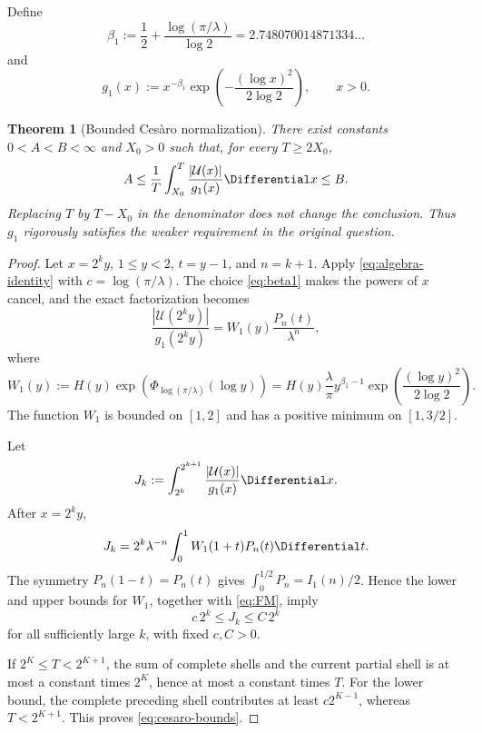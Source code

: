 \documentclass[11pt,oneside]{article}
\newtheorem{theorem}{Theorem}[section]
\theoremstyle{definition}
\theoremstyle{remark}
\newcommand{\Uhat}{\mathcal U}
\begin{document}
Define
\begin{equation}\label{eq:beta1}
 \beta_1:=\frac12+\frac{\log(\pi/\lambda)}{\log2}
 =2.748070014871334\ldots
\end{equation}
and
\begin{equation}\label{eq:g1}
 g_1(x):=x^{-\beta_1}
 \exp\!\left(-\frac{(\log x)^2}{2\log2}\right),\qquad x>0.
\end{equation}

\begin{theorem}[Bounded Ces\`aro normalization]\label{thm:cesaro-bounded}
There exist constants $0<A<B<\infty$ and $X_0>0$ such that, for every $T\ge2X_0$,
\begin{equation}\label{eq:cesaro-bounds}
 A\le\frac1T\int_{X_0}^{T}
 \frac{|\Uhat(x)|}{g_1(x)}\Differential x\le B.
\end{equation}
Replacing $T$ by $T-X_0$ in the denominator does not change the conclusion.  Thus
$g_1$ rigorously satisfies the weaker requirement in the original question.
\end{theorem}

\begin{proof}
Let $x=2^ky$, $1\le y<2$, $t=y-1$, and $n=k+1$.  Apply
\eqref{eq:algebra-identity} with
$c=\log(\pi/\lambda)$.  The choice \eqref{eq:beta1} makes the powers of $x$ cancel,
and the exact factorization becomes
\begin{equation}\label{eq:ratio-exact-L1}
 \frac{|\Uhat(2^ky)|}{g_1(2^ky)}
 =W_1(y)\frac{P_n(t)}{\lambda^n},
\end{equation}
where
\begin{equation}\label{eq:W1}
 W_1(y):=H(y)
 \exp\!\left(\Phi_{\log(\pi/\lambda)}(\log y)\right)
 =H(y)\frac{\lambda}{\pi}
 y^{\beta_1-1}
 \exp\!\left(\frac{(\log y)^2}{2\log2}\right).
\end{equation}
The function $W_1$ is bounded on $[1,2]$ and has a positive minimum on
$[1,3/2]$.

Let
\[
 J_k:=\int_{2^k}^{2^{k+1}}
 \frac{|\Uhat(x)|}{g_1(x)}\Differential x.
\]
After $x=2^ky$,
\begin{equation}\label{eq:Jk}
 J_k=2^k\lambda^{-n}
 \int_0^1W_1(1+t)P_n(t)\Differential t.
\end{equation}
The symmetry $P_n(1-t)=P_n(t)$ gives
$\int_0^{1/2}P_n=I_1(n)/2$.  Hence the lower and upper bounds for $W_1$, together
with \eqref{eq:FM}, imply
\begin{equation}\label{eq:Jk-asymp-bounds}
 c\,2^k\le J_k\le C\,2^k
\end{equation}
for all sufficiently large $k$, with fixed $c,C>0$.

If $2^K\le T<2^{K+1}$, the sum of complete shells and the current partial shell is at
most a constant times $2^K$, hence at most a constant times $T$.  For the lower bound,
the complete preceding shell contributes at least $c2^{K-1}$, whereas
$T<2^{K+1}$.  This proves \eqref{eq:cesaro-bounds}.
\end{proof}
\end{document}
